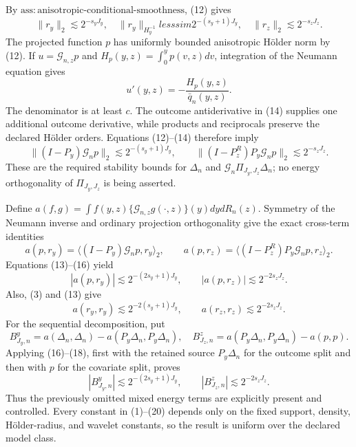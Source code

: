 By \(\mathrm{ass{:}anisotropic\text{-}conditional\text{-}smoothness}\), (12) gives
\[
\|r_y\|_2\lesssim2^{-s_yJ_y},
\quad \|r_y\|_{H_y^{-1}}lesssim2^{-(s_y+1)J_y},
\quad \|r_z\|_2\lesssim2^{-s_zJ_z}.                            \tag{13}
\]
The projected function \(p\) has uniformly bounded anisotropic H\"older norm by (12). If \(u=\mathcal G_{n,z}p\) and \(H_p(y,z)=\int_0^yp(v,z)dv\), integration of the Neumann equation gives
\[
u'(y,z)=-\frac{H_p(y,z)}{\bar q_n(y,z)}.                         \tag{14}
\]
The denominator is at least \(c\). The outcome antiderivative in (14) supplies one additional outcome derivative, while products and reciprocals preserve the declared H\"older orders. Equations (12)--(14) therefore imply
\[
\|(I-P_y)\mathcal G_np\|_2\lesssim2^{-(s_y+1)J_y},
\qquad
\|(I-P_z^R)P_y\mathcal G_np\|_2\lesssim2^{-s_zJ_z}.            \tag{15}
\]
These are the required stability bounds for \(\Delta_n\) and \(\mathcal G_n\Pi_{J_y,J_z}\Delta_n\); no energy orthogonality of \(\Pi_{J_y,J_z}\) is being asserted.

Define \(a(f,g)=\int f(y,z)\{\mathcal G_{n,z}g(\cdot,z)\}(y)dydR_n(z)\). Symmetry of the Neumann inverse and ordinary projection orthogonality give the exact cross-term identities
\[
a(p,r_y)=\langle(I-P_y)\mathcal G_np,r_y\rangle_2,
\qquad
a(p,r_z)=\langle(I-P_z^R)P_y\mathcal G_np,r_z\rangle_2.          \tag{16}
\]
Equations (13)--(16) yield
\[
|a(p,r_y)|\lesssim2^{-(2s_y+1)J_y},
\qquad |a(p,r_z)|\lesssim2^{-2s_zJ_z}.                           \tag{17}
\]
Also, (3) and (13) give
\[
a(r_y,r_y)\lesssim2^{-2(s_y+1)J_y},
\qquad a(r_z,r_z)\lesssim2^{-2s_zJ_z}.                           \tag{18}
\]
For the sequential decomposition, put
\[
B^y_{J_y,n}=a(\Delta_n,\Delta_n)-a(P_y\Delta_n,P_y\Delta_n),
\quad
B^z_{J_z,n}=a(P_y\Delta_n,P_y\Delta_n)-a(p,p).                   \tag{19}
\]
Applying (16)--(18), first with the retained source \(P_y\Delta_n\) for the outcome split and then with \(p\) for the covariate split, proves
\[
|B^y_{J_y,n}|\lesssim2^{-(2s_y+1)J_y},
\qquad |B^z_{J_z,n}|\lesssim2^{-2s_zJ_z}.                        \tag{20}
\]
Thus the previously omitted mixed energy terms are explicitly present and controlled. Every constant in (1)--(20) depends only on the fixed support, density, H\"older-radius, and wavelet constants, so the result is uniform over the declared model class.